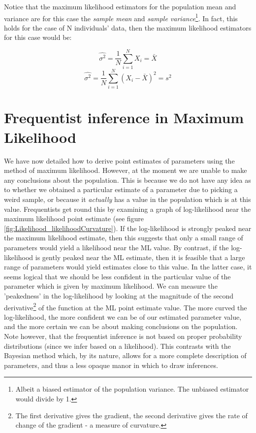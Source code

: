 \documentclass[11pt,fullpage]{book}
\begin{document}
Notice that the maximum likelihood estimators for the population mean and variance are for this case the \textit{sample mean} and \textit{sample variance}\footnote{Albeit a biased estimator of the population variance. The unbiased estimator would divide by 1.}. In fact, this holds for the case of N individuals' data, then the maximum likelihood estimators for this case would be:

\begin{equation}
\hat{\sigma^2} = \frac{1}{N}\sum\limits_{i=1}^{N} X_i = \bar{X}
\end{equation}
\begin{equation}
\hat{\sigma^2} = \frac{1}{N}\sum\limits_{i=1}^{N}(X_i-\bar{X})^2 = s^2
\end{equation}

\section{Frequentist inference in Maximum Likelihood}
We have now detailed how to derive point estimates of parameters using the method of maximum likelihood. However, at the moment we are unable to make any conclusions about the population. This is because we do not have any idea as to whether we obtained a particular estimate of a parameter due to picking a weird sample, or because it \textit{actually} has a value in the population which is at this value. Frequentists get round this by examining a graph of log-likelihood near the maximum likelihood point estimate (see figure \ref{fig:Likelihood_likelihoodCurvature}). If the log-likelihood is strongly peaked near the maximum likelihood estimate, then this suggests that only a small range of parameters would yield a likelihood near the ML value. By contrast, if the log-likelihood is gently peaked near the ML estimate, then it is feasible that a large range of parameters would yield estimates close to this value. In the latter case, it seems logical that we should be less confident in the particular value of the parameter which is given by maximum likelihood. We can measure the 'peakedness' in the log-likelihood by looking at the magnitude of the second derivative\footnote{The first derivative gives the gradient, the second derivative gives the rate of change of the gradient - a measure of curvature.} of the function at the ML point estimate value. The more curved the log-likelihood, the more confident we can be of our estimated parameter value, and the more certain we can be about making conclusions on the population. Note however, that the frequentist inference is not based on proper probability distributions (since we infer based on a likelihood). This contrasts with the Bayesian method which, by its nature, allows for a more complete description of parameters, and thus a less opaque manor in which to draw inferences.
\end{document}
